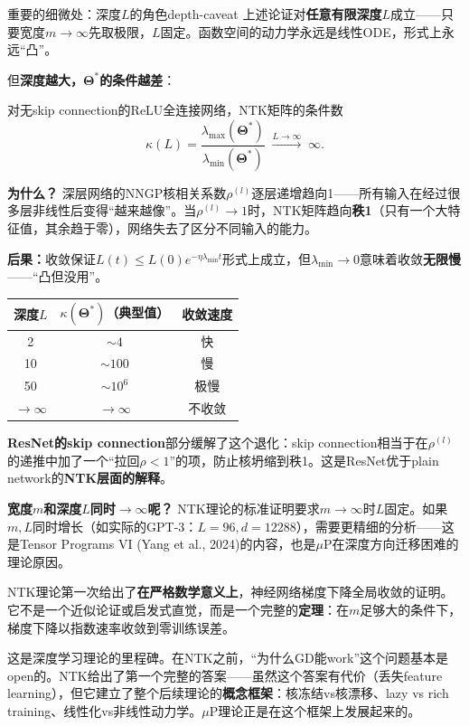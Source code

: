 \documentclass[11pt,a4paper]{article}
\newcommand{\bTheta}{\boldsymbol{\Theta}}
\begin{document}
\begin{remark}{重要的细微处：深度$L$的角色}{depth-caveat}
上述论证对\textbf{任意有限深度$L$}成立——只要宽度$m\to\infty$先取极限，$L$固定。函数空间的动力学永远是线性ODE，形式上永远``凸''。

但\textbf{深度越大，$\bTheta^*$的条件越差}：

对无skip connection的ReLU全连接网络，NTK矩阵的条件数
\[
\kappa(L) = \frac{\lambda_{\max}(\bTheta^*)}{\lambda_{\min}(\bTheta^*)} \;\xrightarrow{L\to\infty}\; \infty.
\]

\textbf{为什么？} 深层网络的NNGP核相关系数$\rho^{(l)}$逐层递增趋向1——所有输入在经过很多层非线性后变得``越来越像''。当$\rho^{(l)}\to 1$时，NTK矩阵趋向\textbf{秩1}（只有一个大特征值，其余趋于零），网络失去了区分不同输入的能力。

\textbf{后果：}收敛保证$L(t)\le L(0)e^{-\eta\lambda_{\min}t}$形式上成立，但$\lambda_{\min}\to 0$意味着收敛\textbf{无限慢}——``凸但没用''。

\begin{center}
\renewcommand{\arraystretch}{1.2}
\begin{tabular}{ccc}
\toprule
深度$L$ & $\kappa(\bTheta^*)$（典型值） & 收敛速度 \\
\midrule
2 & $\sim 4$ & 快 \\
10 & $\sim 100$ & 慢 \\
50 & $\sim 10^6$ & 极慢 \\
$\to\infty$ & $\to\infty$ & 不收敛 \\
\bottomrule
\end{tabular}
\end{center}

\textbf{ResNet的skip connection}部分缓解了这个退化：skip connection相当于在$\rho^{(l)}$的递推中加了一个``拉回$\rho<1$''的项，防止核坍缩到秩1。这是ResNet优于plain network的\textbf{NTK层面的解释}。

\textbf{宽度$m$和深度$L$同时$\to\infty$呢？} NTK理论的标准证明要求$m\to\infty$时$L$固定。如果$m,L$同时增长（如实际的GPT-3：$L=96, d=12288$），需要更精细的分析——这是Tensor Programs VI (Yang et al., 2024)的内容，也是$\mu$P在深度方向迁移困难的理论原因。
\end{remark}

\begin{keyinsight}[——NTK的理论地位]
NTK理论第一次给出了\textbf{在严格数学意义上}，神经网络梯度下降全局收敛的证明。它不是一个近似论证或启发式直觉，而是一个完整的\textbf{定理}：在$m$足够大的条件下，梯度下降以指数速率收敛到零训练误差。

这是深度学习理论的里程碑。在NTK之前，``为什么GD能work''这个问题基本是open的。NTK给出了第一个完整的答案——虽然这个答案有代价（丢失feature learning），但它建立了整个后续理论的\textbf{概念框架}：核冻结vs核漂移、lazy vs rich training、线性化vs非线性动力学。$\mu$P理论正是在这个框架上发展起来的。
\end{keyinsight}
\end{document}
